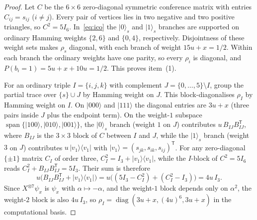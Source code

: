 \begin{proof}
Let $C$ be the $6\times6$ zero-diagonal symmetric conference matrix with entries $C_{ij}=s_{ij}$ ($i\ne j$).
Every pair of vertices lies in two negative and two positive triangles, so $C^2=5I_6$.
In~\eqref{eq:ico} the $|0\rangle_s$ and $|1\rangle_s$ branches are supported on ordinary Hamming weights
$\{2,6\}$ and $\{0,4\}$, respectively. Disjointness of these weight sets makes $\rho_s$ diagonal, with each branch of weight $15u+x=1/2$.
Within each branch the ordinary weights have one parity, so every $\rho_i$ is diagonal, and
$P(b_i=1)=5u+x+10u=1/2$. This proves item~(1).

For an ordinary triple $I=\{i,j,k\}$ with complement $J=\{0,\dots,5\}\setminus I$, group the partial trace over $\{s\}\cup J$ by Hamming weight on $J$. This block-diagonalises $\rho_I$ by Hamming weight on $I$. On $|000\rangle$ and $|111\rangle$ the diagonal entries are $3u+x$ (three pairs inside $J$ plus the endpoint term). On the weight-$1$ subspace $\operatorname{span}\{|100\rangle,|010\rangle,|001\rangle\}$, the $|0\rangle_s$ branch (weight $1$ on $J$) contributes $u\,B_{IJ}B_{IJ}^{\mathsf T}$, where $B_{IJ}$ is the $3\times3$ block of $C$ between $I$ and $J$, while the $|1\rangle_s$ branch (weight $3$ on $J$) contributes $u\,|v_1\rangle\langle v_1|$ with $|v_1\rangle=(s_{jk},s_{ik},s_{ij})^{\mathsf T}$. For any zero-diagonal $\{\pm1\}$ matrix $C_I$ of order three, $C_I^2=I_3+|v_1\rangle\langle v_1|$, while the $I$-block of $C^2=5I_6$ reads $C_I^2+B_{IJ}B_{IJ}^{\mathsf T}=5I_3$. Their sum is therefore
\[
 u\bigl(B_{IJ}B_{IJ}^{\mathsf T}+|v_1\rangle\langle v_1|\bigr)
 =u\bigl((5I_3-C_I^2)+(C_I^2-I_3)\bigr)=4u\,I_3.
\]
Since $X^{\otimes7}\psi_x$ is $\psi_x$ with $\alpha\mapsto-\alpha$, and the weight-$1$ block depends only on $\alpha^2$, the weight-$2$ block is also $4u\,I_3$, so $\rho_I=\operatorname{diag}(3u+x,(4u)^6,3u+x)$ in the computational basis.


\end{proof}
